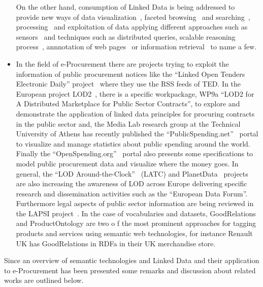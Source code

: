 \begin{itemize}
 On the other hand, consumption of Linked Data is being addressed to provide new ways of data visualization~\cite{DBLP:journals/semweb/DadzieR11,hoga-etal-2011-swse-JWS}, 
 faceted browsing~\cite{Pietriga06fresnel, citeulike:8529753,Sparallax} and searching~\cite{hoga-etal-2011-swse-JWS}, processing~\cite{Harth:2011:SIP:1963192.1963318} and exploitation of data applying 
 different approaches such as sensors~\cite{Jeung:2010:EMM:1850003.1850235,ontology-search} and techniques such as distributed queries\cite{Hartig09executingsparql,Ankolekar07thetwo,sparqlOpt}, 
 scalable reasoning process~\cite{Urbani2010WebPIE,HoganHarthPolleres2009,DBLP:conf/semweb/HoganPPD10}, 
 annnotation of web pages~\cite{rdfa-primer} or information retrieval~\cite{Pound} to name a few.
  
 \item In the field of e-Procurement there are projects trying to exploit the 
 information of public procurement notices like the ``Linked Open Tenders Electronic Daily'' project~\cite{loted} 
 where they use the RSS feeds of TED.  In the European project LOD2~\cite{lod2-project}, there is a specific workpackage, 
 WP9a ``LOD2 for A Distributed Marketplace for Public Sector Contracts'', to explore and demonstrate the 
 application of linked data principles for procuring contracts in the public sector and, 
 the Media Lab research group at the Technical University of Athens has recently published the 
 ``PublicSpending.net''~\cite{publicspending} portal to visualize and manage statistics about public spending around the world. 
 Finally the ``OpenSpending.org''~\cite{open-spending} portal also presents some specifications to model public procurement data and 
 visualize where the money goes. In general, the ``LOD Around-the-Clock''~\cite{latc-project} (LATC) and PlanetData~\cite{planet-data-project} 
 projects are also increasing the awareness of LOD across Europe delivering specific research and dissemination activities such as the 
 ``European Data Forum''. Furthermore legal aspects of public sector information are being reviewed in the 
 LAPSI project~\cite{lapsi-project}. In the case of vocabularies and datasets, GoodRelations and ProductOntology are two o
 f the most prominent approaches for tagging products and services using semantic web technologies, 
 for instance Renault UK has GoodRelations in RDFa in their UK merchandise store.

\end{itemize}

 Since an overview of semantic technologies and Linked Data and their application to e-Procurement has been presented 
 some remarks and discussion about related works are outlined below.
 
